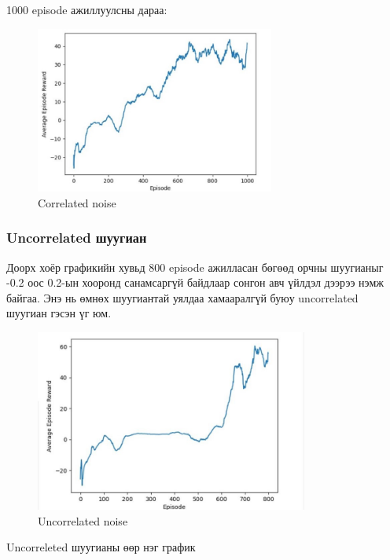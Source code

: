\documentclass[12pt,A4]{report}
\begin{document}
1000 episode ажиллуулсны дараа:

\begin{figure}[H]
\centering
\includegraphics[width=0.7\textwidth]{./images/after_1000_ep2}
\caption{Correlated noise}
\end{figure}

\subsubsection{Uncorrelated шуугиан}

Доорх хоёр графикийн хувьд 800 episode ажилласан бөгөөд орчны шуугианыг -0.2 оос 0.2-ын хооронд санамсаргүй байдлаар сонгон авч үйлдэл дээрээ нэмж байгаа. Энэ нь өмнөх шуугиантай уялдаа хамааралгүй буюу uncorrelated шуугиан гэсэн үг юм. 

\begin{figure}[H]
\centering
\includegraphics[width=0.8\textwidth]{./images/after_800_ep_02}
\caption{Uncorrelated noise}
\end{figure}

Uncorreleted шуугианы өөр нэг график
\end{document}
